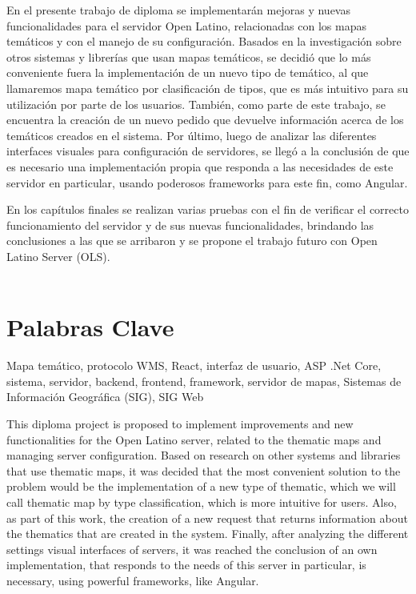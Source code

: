 
En el presente trabajo de diploma se implementar\'an mejoras y nuevas funcionalidades para el servidor Open Latino, relacionadas con los mapas tem\'aticos y con el manejo de su configuraci\'on. Basados en la investigaci\'on sobre otros sistemas y librer\'ias que usan mapas tem\'aticos, se decidi\'o que lo m\'as conveniente fuera la implementaci\'on de un nuevo tipo de tem\'atico, al que llamaremos mapa tem\'atico por clasificaci\'on de tipos, que es m\'as intuitivo para su utilizaci\'on por parte de los usuarios. Tambi\'en, como parte de este trabajo, se encuentra la creaci\'on de un nuevo pedido que devuelve informaci\'on acerca de los tem\'aticos creados en el sistema. Por \'ultimo, luego de analizar las diferentes interfaces visuales para configuraci\'on de servidores, se lleg\'o a la conclusi\'on de que es necesario una implementaci\'on propia que responda a las necesidades de este servidor en particular, usando poderosos frameworks para este fin, como Angular.

En los cap\'itulos finales se realizan varias pruebas con el fin de verificar el correcto funcionamiento del servidor y de sus nuevas funcionalidades, brindando las conclusiones a las que se arribaron y se propone el trabajo futuro con Open Latino Server (OLS).\\\\

\section*{Palabras Clave}
Mapa tem\'atico, protocolo WMS, React, interfaz de usuario, ASP .Net Core, sistema, servidor, backend, frontend, framework, servidor de mapas, Sistemas de Informaci\'on Geogr\'afica (SIG), SIG Web


This diploma project is proposed to implement improvements and new functionalities for the Open Latino server, related to the thematic maps and managing server configuration. Based on research on other systems and libraries that use thematic maps, it was decided that the most convenient solution to the problem would be the implementation of a new type of thematic, which we will call thematic map by type classification, which is more intuitive for users. Also, as part of this work, the creation of a new request that returns information about the thematics that are created in the system. Finally, after analyzing the different settings visual interfaces of servers, it was reached the conclusion of an own implementation, that responds to the needs of this server in particular, is necessary, using powerful frameworks, like Angular. 

